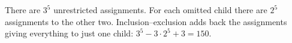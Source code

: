 There are $3^5$ unrestricted assignments. For each omitted child there are $2^5$ assignments to the other two. Inclusion--exclusion adds back the assignments giving everything to just one child: $3^5-3\cdot2^5+3=\boxed{150}$.
